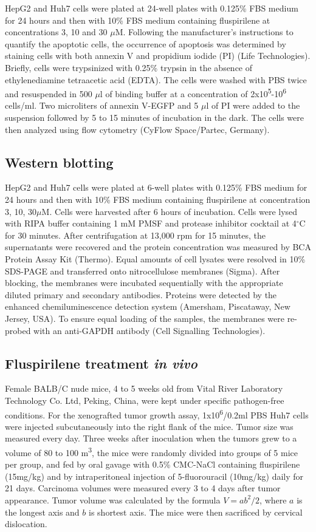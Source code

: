 \documentclass[10pt,letterpaper]{article}
\begin{document}
HepG2 and Huh7 cells were plated at 24-well plates with 0.125\% FBS medium for 24 hours and then with 10\% FBS medium containing fluspirilene at concentrations 3, 10 and 30 $\mu$M. Following the manufacturer's instructions to quantify the apoptotic cells, the occurrence of apoptosis was determined by staining cells with both annexin V and propidium iodide (PI) (Life Technologies). Briefly, cells were trypsinized with 0.25\% trypsin in the absence of ethylenediamine tetraacetic acid (EDTA). The cells were washed with PBS twice and resuspended in 500 $\mu$l of binding buffer at a concentration of 2x10\textsuperscript{5}-10\textsuperscript{6} cells/ml. Two microliters of annexin V-EGFP and 5 $\mu$l of PI were added to the suspension followed by 5 to 15 minutes of incubation in the dark. The cells were then analyzed using flow cytometry (CyFlow Space/Partec, Germany).

\subsection*{Western blotting}

HepG2 and Huh7 cells were plated at 6-well plates with 0.125\% FBS medium for 24 hours and then with 10\% FBS medium containing fluspirilene at concentration 3, 10, 30$\mu$M. Cells were harvested after 6 hours of incubation. Cells were lysed with RIPA buffer containing 1 mM PMSF and protease inhibitor cocktail at 4$^\circ$C for 30 minutes. After centrifugation at 13,000 rpm for 15 minutes, the supernatants were recovered and the protein concentration was measured by BCA Protein Assay Kit (Thermo). Equal amounts of cell lysates were resolved in 10\% SDS-PAGE and transferred onto nitrocellulose membranes (Sigma). After blocking, the membranes were incubated sequentially with the appropriate diluted primary and secondary antibodies. Proteins were detected by the enhanced chemiluminescence detection system (Amersham, Piscataway, New Jersey, USA). To ensure equal loading of the samples, the membranes were re-probed with an anti-GAPDH antibody (Cell Signalling Technologies).

\subsection*{Fluspirilene treatment \textit{in vivo}}

Female BALB/C nude mice, 4 to 5 weeks old from Vital River Laboratory Technology Co. Ltd, Peking, China, were kept under specific pathogen-free conditions. For the xenografted tumor growth assay, 1x10\textsuperscript{6}/0.2ml PBS Huh7 cells were injected subcutaneously into the right flank of the mice. Tumor size was measured every day. Three weeks after inoculation when the tumors grew to a volume of 80 to 100 m\textsuperscript{3}, the mice were randomly divided into groups of 5 mice per group, and fed by oral gavage with 0.5\% CMC-NaCl containing fluspirilene (15mg/kg) and by intraperitoneal injection of 5-fluorouracil (10mg/kg) daily for 21 days. Carcinoma volumes were measured every 3 to 4 days after tumor appearance. Tumor volume was calculated by the formula $V=ab^2/2$, where $a$ is the longest axis and $b$ is shortest axis. The mice were then sacrificed by cervical dislocation.
\end{document}

